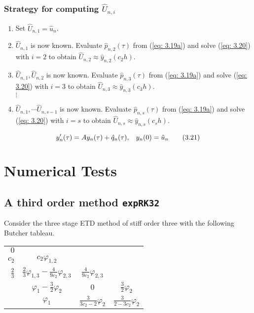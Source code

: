 \documentclass[12pt]{article}
\begin{document}
\subsubsection{Strategy for computing $\hat{U}_{n,i}$}
\begin{enumerate}
\item Set $\hat{U}_{n,1} = \hat{u}_n$.
\item $\hat{U}_{n,1}$ is now known. Evaluate $\hat{p}_{n,2}(\tau)$ from (\ref{eq: 3.19a}) and solve (\ref{eq: 3.20}) with $i=2$ to obtain $\hat{U}_{n,2} \approx \hat{y}_{n,2}(c_2h)$.
\item $\hat{U}_{n,1}, \hat{U}_{n,2} $ is now known. Evaluate $\hat{p}_{n,3}(\tau)$ from (\ref{eq: 3.19a}) and solve (\ref{eq: 3.20}) with $i=3$ to obtain $\hat{U}_{n,3} \approx \hat{y}_{n,3}(c_3h)$.\\
$\vdots$
\item $\hat{U}_{n,1},\cdots \hat{U}_{n,s-1} $ is now known. Evaluate $\hat{p}_{n,s}(\tau)$ from (\ref{eq: 3.19a}) and solve (\ref{eq: 3.20}) with $i=s$ to obtain $\hat{U}_{n,s} \approx \hat{y}_{n,s}(c_sh)$.
\end{enumerate}

\begin{equation}
y'_{n}(\tau) = Ay_{n}(\tau) + \hat{q}_{n}(\tau), \hspace{0.3cm} y_{n}(0) = \hat{u}_n 
\tag{3.21} \label{eq: 3.21}
\end{equation}
\section{Numerical Tests} 
\subsection{A third order method \texttt{expRK32}} 
Consider the three stage ETD method of stiff order three with the following Butcher tableau.
\begin{center}
\begin{table}[h!]
\begin{tabular}{r|c c c}
$0$ &  &  &  \\
$c_2$ & $c_2\varphi_{1,2}$ &  \\
$\frac{2}{3}$ & $\frac{2}{3}\varphi_{1,3} - \frac{4}{9c_2}\varphi_{2,3}$ & $\frac{4}{9c_2}\varphi_{2,3}$\\
\hline 
 & $\varphi_1 - \frac{3}{2}\varphi_2 $ & $0$ & $\frac{3}{2}\varphi_2$\\
 & $\varphi_1$ & $\frac{3}{3c_2 - 2}\varphi_2$ & $\frac{3}{2 - 3c_2}\varphi_2$ 
\end{tabular}
\end{table}
\end{center}
\end{document}
